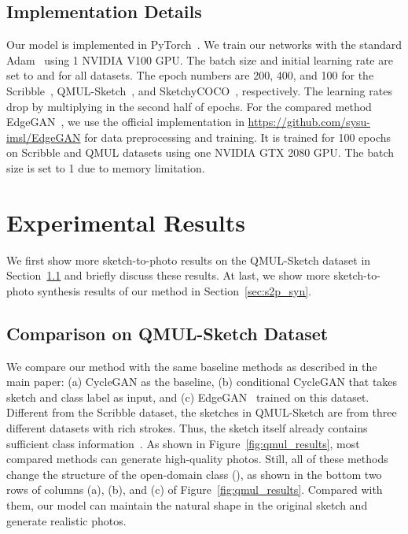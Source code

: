 \documentclass[10pt,twocolumn,letterpaper]{article}
\begin{document}
\subsection{Implementation Details} 
\label{sec:imple}
Our model is implemented in PyTorch~\cite{paszke2017automatic,paszke2019pytorch}. We train our networks with the standard Adam~\cite{kingma2014adam} using 1 NVIDIA V100 GPU. The batch size and initial learning rate are set to  and  for all datasets. The epoch numbers are 200, 400, and 100 for the Scribble~\cite{ghosh2019interactive}, QMUL-Sketch~\cite{yu2016sketch,song2017deep,liu2019unpaired}, and SketchyCOCO~\cite{gao2020sketchycoco}, respectively. The learning rates drop by multiplying  in the second half of epochs. 
For the compared method EdgeGAN~\cite{gao2020sketchycoco}, we use the official implementation in \href{https://github.com/sysu-imsl/EdgeGAN}{https://github.com/sysu-imsl/EdgeGAN} for data preprocessing and training. It is trained for 100 epochs on Scribble and QMUL datasets using one NVIDIA GTX 2080 GPU. The batch size is set to 1 due to memory limitation. 

\section{Experimental Results}
\label{sec:exp_res}
We first show more sketch-to-photo results on the QMUL-Sketch dataset in Section~\ref{sec:qmul} and briefly discuss these results. At last, we show more sketch-to-photo synthesis results of our method in Section~\ref{sec:s2p_syn}. 

\subsection{Comparison on QMUL-Sketch Dataset}
\label{sec:qmul}
 We compare our method with the same baseline methods as described in the main paper: (a) CycleGAN as the baseline, (b) conditional CycleGAN that takes sketch and class label as input, and (c) EdgeGAN~\cite{gao2020sketchycoco} trained on this dataset. Different from the Scribble dataset, the sketches in QMUL-Sketch are from three different datasets with rich strokes. Thus, the sketch itself already contains sufficient class information~\cite{liu2019unpaired}. As shown in Figure~\ref{fig:qmul_results}, most compared methods can generate high-quality photos. Still, all of these methods change the structure of the open-domain class (), as shown in the bottom two rows of columns (a), (b), and (c) of Figure~\ref{fig:qmul_results}. Compared with them, our model can maintain the natural shape in the original sketch and generate realistic photos.
\end{document}
